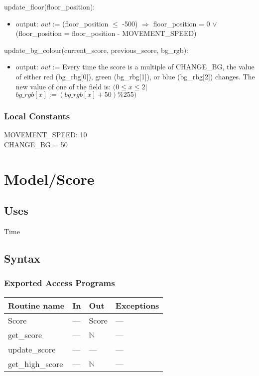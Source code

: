 \documentclass[12pt]{article}
\begin{document}
update\_floor(floor\_position):
\begin{itemize}
    \item output: \textit{out} := (floor\_position $\leq$ -500) $\Rightarrow$ floor\_position = 0 $\lor$ (floor\_position = floor\_position - MOVEMENT\_SPEED)
\end{itemize}
\noindent update\_bg\_colour(current\_score, previous\_score, bg\_rgb):
\begin{itemize}
    \item output: \textit{out} := Every time the score is a multiple of CHANGE\_BG, the value of either red (bg\_rbg[0]), green (bg\_rbg[1]), or blue (bg\_rbg[2]) changes. The new value of one of the field is: $(0 \leq x \leq 2 |$ $bg\_rgb[x] := (bg\_rgb[x]+50)\%255 )$
\end{itemize}
\subsubsection* {Local Constants}
MOVEMENT\_SPEED: 10 \\
CHANGE\_BG = 50
\newpage
\section*{Model/Score}

\subsection* {Uses}

Time

\subsection* {Syntax}

\subsubsection* {Exported Access Programs}

\begin{tabular}{| l | l | l | l |}
\hline
\textbf{Routine name} & \textbf{In} & \textbf{Out} & \textbf{Exceptions}\\
\hline
    Score &--- & Score& ---\\
\hline 
    get\_score & --- & $\mathbb{N}$ & --- \\
\hline
    update\_score & --- & --- & ---\\
\hline
    get\_high\_score & --- & $\mathbb{N}$ & --- \\
\hline
\end{tabular}
\end{document}
